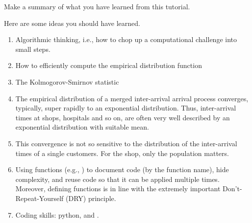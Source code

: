 \begin{exercise}
  Make a summary of what you have learned from this tutorial.
  \begin{solution}
    Here are some ideas you should have learned. 
    \begin{enumerate}
    \item Algorithmic thinking, i.e., how to chop up a computational challenge into small steps.
    \item How to efficiently compute the empirical distribution function
    \item The Kolmogorov-Smirnov statistic
    \item The empirical distribution of a  merged inter-arrival arrival process converges, typically, super rapidly to an exponential distribution. Thus,  inter-arrival times at shops, hospitals and so on, are often very well described by an exponential distribution with suitable mean. 
    \item This convergence is not so sensitive to the distribution of the inter-arrival times of a single customers. For the shop, only the population matters. 
    \item Using functions (e.g., )  to document code  (by the function name), hide complexity, and reuse code so that it can be applied multiple times. Moreover, defining functions is in line with the extremely important Don't-Repeat-Yourself (DRY) principle. 
    \item Coding skills: python,  and .
    \end{enumerate}
  \end{solution}
\end{exercise}








